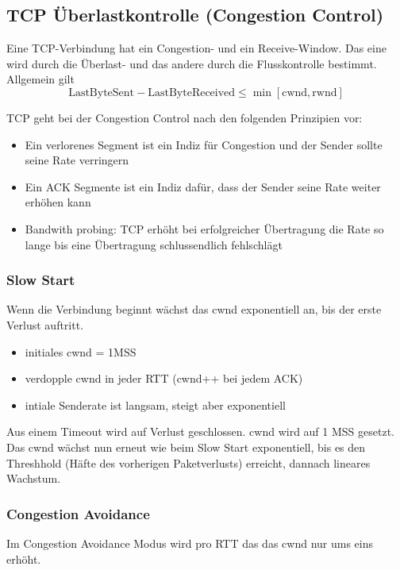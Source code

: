\subsection{TCP Überlastkontrolle (Congestion Control)}
Eine TCP-Verbindung hat ein Congestion- und ein Receive-Window. Das eine wird durch die Überlast- und das andere durch die Flusskontrolle bestimmt.\\
Allgemein gilt 
\begin{equation}
    \text{LastByteSent} - \text{LastByteReceived} \leq \operatorname{min}[\text{cwnd},\text{rwnd}] 
\end{equation}

TCP geht bei der Congestion Control nach den folgenden Prinzipien vor:
\begin{itemize}
    \item Ein verlorenes Segment ist ein Indiz für Congestion und der Sender sollte seine Rate verringern
    \item Ein ACK Segmente ist ein Indiz dafür, dass der Sender seine Rate weiter erhöhen kann
    \item Bandwith probing: TCP erhöht bei erfolgreicher Übertragung die Rate so lange bis eine Übertragung schlussendlich fehlschlägt
\end{itemize}

\subsubsection{Slow Start}
Wenn die Verbindung beginnt wächst das cwnd exponentiell an, bis der erste Verlust auftritt.
\begin{itemize}
    \item initiales cwnd = 1MSS
    \item verdopple cwnd in jeder RTT (cwnd++ bei jedem ACK)
    \item intiale Senderate ist langsam, steigt aber exponentiell
\end{itemize}
Aus einem Timeout wird auf Verlust geschlossen. cwnd wird auf 1 MSS gesetzt. Das cwnd wächst nun erneut wie beim Slow Start exponentiell, bis es den Threshhold (Häfte des vorherigen Paketverlusts) erreicht, dannach lineares Wachstum.

\subsubsection{Congestion Avoidance}
Im Congestion Avoidance Modus wird pro RTT das das cwnd nur ums eins erhöht.


